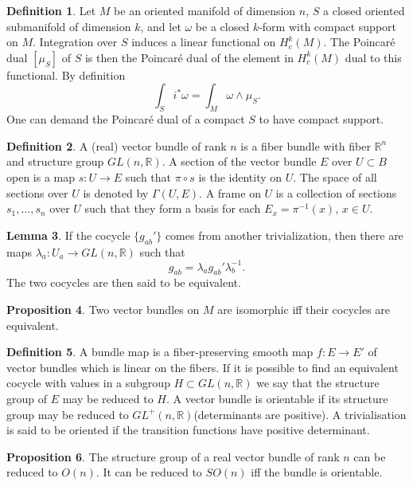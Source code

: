 \documentclass[twocolumn]{article}
\theoremstyle{definition}
\newtheorem{definition}{Definition}[section]
\newtheorem{lemma}[definition]{Lemma}
\newtheorem{proposition}[definition]{Proposition}
\theoremstyle{remark}
\begin{document}
\begin{definition}
    Let $M$ be an oriented manifold of dimension $n$, $S$ a closed oriented submanifold of dimension $k$,
    and let $\omega$ be a closed $k$-form with compact support on $M$.
    Integration over $S$ induces a linear functional on $H^k_c(M)$. The Poincaré dual $[\mu_S]$ of $S$ is then the Poincaré dual of the element in $H^k_c(M)$ dual to this functional.
    By definition
    \begin{equation}
        \int_S i^* \omega = \int_M \omega \wedge \mu_S.
    \end{equation}
    One can demand the Poincaré dual of a compact $S$ to have compact support.
\end{definition}

\begin{definition}
    A (real) vector bundle of rank $n$ is a fiber bundle with fiber $\mathbb{R}^n$ and structure group $GL(n, \mathbb{R})$.
    A section of the vector bundle $E$ over $U \subset B$ open is a map $s: U \rightarrow E$ such that $\pi \circ s$ is the identity on $U$.
    The space of all sections over $U$ is denoted by $\Gamma(U, E)$.
    A frame on $U$ is a collection of sections $s_1, \dots, s_n$ over $U$ such that they form a basis for each $E_x = \pi^{-1}(x),\, x\in U$.
\end{definition}
\begin{lemma}
    If the cocycle $\{g_{ab}'\}$ comes from another trivialization, then there are maps $\lambda_a: U_a \rightarrow GL(n,\mathbb{R})$ such that
    \begin{equation}
        g_{ab} = \lambda_a g_{ab}' \lambda^{-1}_b.
    \end{equation}
    The two cocycles are then said to be equivalent.
\end{lemma}
\begin{proposition}
    Two vector bundles on $M$ are isomorphic iff their cocycles are equivalent.
\end{proposition}
\begin{definition}
    A bundle map is a fiber-preserving smooth map $f: E\rightarrow E'$ of vector bundles which is linear on the fibers.
    If it is possible to find an equivalent cocycle with values in a subgroup $H \subset GL(n, \mathbb{R})$ we say that the structure group of $E$ may be reduced to $H$.
    A vector bundle is orientable if its structure group may be reduced to $GL^+(n,\mathbb{R})$(determinants are positive).
    A trivialisation is said to be oriented if the transition functions have positive determinant.
\end{definition}
\begin{proposition}
    The structure group of a real vector bundle of rank $n$ can be reduced to $O(n)$. It can be reduced to $SO(n)$ iff the bundle is orientable.
\end{proposition}
\end{document}

